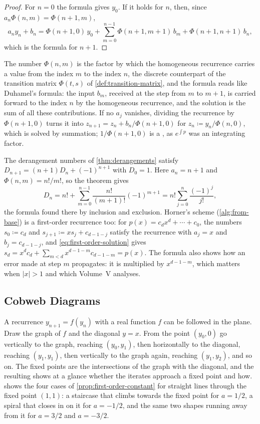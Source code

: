 \begin{proof}
For $n=0$ the formula gives $y_0$. If it holds for $n$, then, since $a_n\Phi(n,m)=\Phi(n+1,m)$,
\[
a_ny_n+b_n=\Phi(n+1,0)\,y_0+\sum_{m=0}^{n-1}\Phi(n+1,m+1)\,b_m+\Phi(n+1,n+1)\,b_n ,
\]
which is the formula for $n+1$.
\end{proof}

The number $\Phi(n,m)$ is the factor by which the homogeneous recurrence carries a value from the index $m$ to the index $n$, the discrete counterpart of the transition matrix $\Phi(t,s)$ of \cref{def:transition-matrix}, and the formula reads like Duhamel's formula: the input $b_m$, received at the step from $m$ to $m+1$, is carried forward to the index $n$ by the homogeneous recurrence, and the solution is the sum of all these contributions. If no $a_j$ vanishes, dividing the recurrence by $\Phi(n+1,0)$ turns it into $z_{n+1}=z_n+b_n/\Phi(n+1,0)$ for $z_n\coloneqq y_n/\Phi(n,0)$, which is solved by summation; $1/\Phi(n+1,0)$ is a , as $e^{\int p}$ was an integrating factor.

The derangement numbers of \cref{thm:derangements} satisfy $D_{n+1}=(n+1)D_n+(-1)^{n+1}$ with $D_0=1$. Here $a_n=n+1$ and $\Phi(n,m)=n!/m!$, so the theorem gives
\[
D_n=n!+\sum_{m=0}^{n-1}\frac{n!}{(m+1)!}(-1)^{m+1}=n!\sum_{j=0}^n\frac{(-1)^j}{j!},
\]
the formula found there by inclusion and exclusion. Horner's scheme (\cref{alg:from-base}) is a first-order recurrence too: for $p(x)=c_dx^d+\cdots+c_0$, the numbers $s_0\coloneqq c_d$ and $s_{j+1}\coloneqq xs_j+c_{d-1-j}$ satisfy the recurrence with $a_j=x$ and $b_j=c_{d-1-j}$, and \eqref{eq:first-order-solution} gives $s_d=x^dc_d+\sum_{m<d}x^{d-1-m}c_{d-1-m}=p(x)$. The formula also shows how an error made at step $m$ propagates: it is multiplied by $x^{d-1-m}$, which matters when $|x|>1$ and which Volume~V analyses.

\subsection{Cobweb Diagrams}

A recurrence $y_{n+1}=f(y_n)$ with a real function $f$ can be followed in the plane. Draw the graph of $f$ and the diagonal $y=x$. From the point $(y_0,0)$ go vertically to the graph, reaching $(y_0,y_1)$, then horizontally to the diagonal, reaching $(y_1,y_1)$, then vertically to the graph again, reaching $(y_1,y_2)$, and so on. The fixed points are the intersections of the graph with the diagonal, and the resulting  shows at a glance whether the iterates approach a fixed point and how.  shows the four cases of \cref{prop:first-order-constant} for straight lines through the fixed point $(1,1)$: a staircase that climbs towards the fixed point for $a=1/2$, a spiral that closes in on it for $a=-1/2$, and the same two shapes running away from it for $a=3/2$ and $a=-3/2$.

